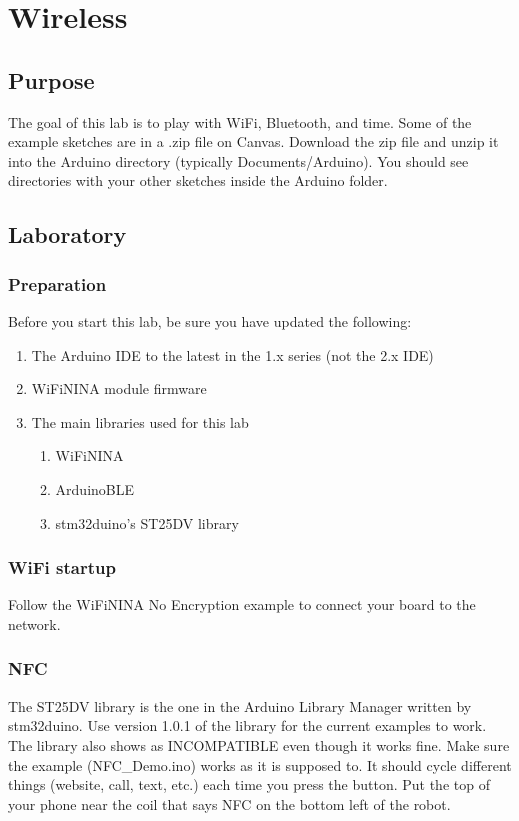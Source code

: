 \chapter{Wireless}

\section{Purpose}
The goal of this lab is to play with WiFi, Bluetooth, and time. Some of the example
sketches are in a .zip file on Canvas. Download the zip file and unzip it into the 
Arduino directory (typically Documents/Arduino). You should see directories with 
your other sketches inside the Arduino folder.

\section{Laboratory}
\subsection{Preparation}
Before you start this lab, be sure you have updated the following:
\begin{enumerate}
    \item The Arduino IDE to the latest in the 1.x series (not the 2.x IDE)
    \item WiFiNINA module firmware
    \item The main libraries used for this lab 
    \begin{enumerate}
        \item WiFiNINA
        \item ArduinoBLE
        \item stm32duino's ST25DV library
    \end{enumerate}
\end{enumerate}

\subsection{WiFi startup}
Follow the WiFiNINA No Encryption example to connect your board to the network.

\subsection{NFC}
The ST25DV library is the one in the Arduino Library Manager written by stm32duino.
Use version 1.0.1 of the library for the current examples to work. The library also 
shows as INCOMPATIBLE even though it works fine. Make sure the example (NFC\_Demo.ino) 
works as it is supposed to. It should cycle 
different things (website, call, text, etc.) each time you press the button. Put 
the top of your phone near the coil that says NFC on the bottom left of the robot.

